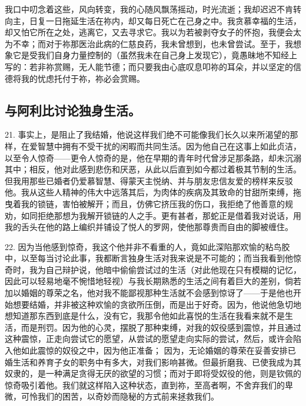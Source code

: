 我口中叨念着这些，风向转变，我的心随风飘荡摇动，时光流逝；我却迟迟不肯转向主，日复一日拖延生活在祢内，却又每日死亡在己身之中。我贪慕幸福的生活，却又怕它所在之处，逃离它，又去寻求它。我以为若被剥夺女子的怀抱，我便会太为不幸；而对于祢那医治此病的仁慈良药，我未曾想到，也未曾尝试。至于，我想象它是受我们自身力量控制的（虽然我未在自己身上发现它），竟愚昧地不知经上写的：若非祢赏赐，无人能节德；而只要我由心底叹息叩祢的耳朵，并以坚定的信德将我的忧虑托付于祢，祢必会赏赐。\par


\subsection{与阿利比讨论独身生活。}

21. 事实上，是阻止了我结婚，他说这样我们绝不可能像我们长久以来所渴望的那样，在爱智慧中拥有不受干扰的闲暇而共同生活。因为他自己在这事上如此贞洁，以至令人惊奇——更令人惊奇的是，他在早期的青年时代曾涉足那条路，却未沉溺其中；相反，他对此感到悲伤和厌恶，从此以后直到如今都过着极其节制的生活。但我用那些已婚者仍爱慕智慧、得蒙天主悦纳、并与朋友忠信友爱的榜样来反驳他。我从这些人精神的伟大中远落其后，为肉体的疾病及其致命的甘甜所束缚，拖曳着我的锁链，害怕被解开；而且，仿佛它挤压我的伤口，我拒绝了他善意的规劝，如同拒绝那想为我解开锁链的人之手。更有甚者，那蛇正是借着我对说话，用我的舌头在他的路上编织并铺设了悦人的罗网，使他那尊贵而自由的脚被缠住。\par

22. 因为当他感到惊奇，我这个他并非不看重的人，竟如此深陷那欢愉的粘鸟胶中，以至每当讨论此事，我都断言独身生活对我来说是不可能的；而当我看到他惊奇时，我为自己辩护说，他暗中偷偷尝试过的生活（对此他现在只有模糊的记忆，因此可以轻易地毫不惋惜地轻视）与我长期熟悉的生活之间有着巨大的差别，倘若加以婚姻的尊荣之名，他对我不能鄙视那种生活就不会感到惊讶了——于是他也开始想要结婚，并非被这种欢愉的贪欲所压倒，而是出于好奇。因为，他说他急切地想知道那东西到底是什么，没有它，我那令他如此喜悦的生活在我看来就不是生活，而是刑罚。因为他的心灵，摆脱了那种束缚，对我的奴役感到震惊，并且通过这种震惊，正走向尝试它的愿望，从尝试的愿望走向实际的尝试，然后，或许会陷入他如此震惊的奴役之中，因为他正准备； 因为，无论婚姻的尊荣在妥善安排已婚生活和养育子女的职务中有多大，对我们影响甚微。但最折磨我、已使我成为其奴隶的，是一种满足贪得无厌的欲望的习惯；而对于即将受奴役的他，则是钦佩的惊奇吸引着他。我们就这样陷入这种状态，直到祢，至高者啊，不舍弃我们的卑微，可怜我们的困苦，以奇妙而隐秘的方式前来拯救我们。\par

